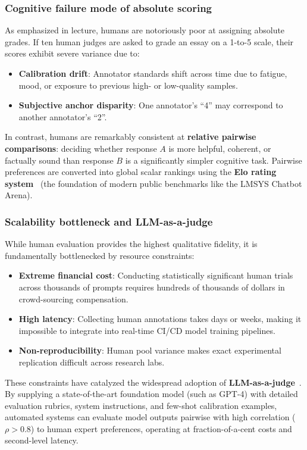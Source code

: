 \documentclass[../../main.tex]{subfiles}
\begin{document}
\subsubsection{Cognitive failure mode of absolute scoring}
As emphasized in lecture, humans are notoriously poor at assigning absolute grades. If ten human judges are asked to grade an essay on a 1-to-5 scale, their scores exhibit severe variance due to:
\begin{itemize}
    \item \textbf{Calibration drift}: Annotator standards shift across time due to fatigue, mood, or exposure to previous high- or low-quality samples.
    \item \textbf{Subjective anchor disparity}: One annotator's ``4'' may correspond to another annotator's ``2''.
\end{itemize}
In contrast, humans are remarkably consistent at \textbf{relative pairwise comparisons}: deciding whether response $A$ is more helpful, coherent, or factually sound than response $B$ is a significantly simpler cognitive task. Pairwise preferences are converted into global scalar rankings using the \textbf{Elo rating system}~\cite{zheng2023judging} (the foundation of modern public benchmarks like the LMSYS Chatbot Arena).

\subsubsection{Scalability bottleneck and LLM-as-a-judge}
While human evaluation provides the highest qualitative fidelity, it is fundamentally bottlenecked by resource constraints:
\begin{itemize}
    \item \textbf{Extreme financial cost}: Conducting statistically significant human trials across thousands of prompts requires hundreds of thousands of dollars in crowd-sourcing compensation.
    \item \textbf{High latency}: Collecting human annotations takes days or weeks, making it impossible to integrate into real-time CI/CD model training pipelines.
    \item \textbf{Non-reproducibility}: Human pool variance makes exact experimental replication difficult across research labs.
\end{itemize}

These constraints have catalyzed the widespread adoption of \textbf{LLM-as-a-judge}~\cite{zheng2023judging}. By supplying a state-of-the-art foundation model (such as GPT-4) with detailed evaluation rubrics, system instructions, and few-shot calibration examples, automated systems can evaluate model outputs pairwise with high correlation ($\rho > 0.8$) to human expert preferences, operating at fraction-of-a-cent costs and second-level latency.
\end{document}
